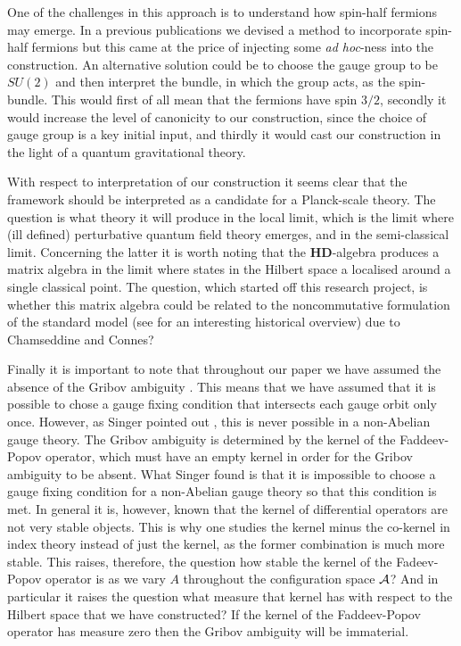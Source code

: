 \documentclass[letterpaper,11pt]{article}
\def\ca{{\cal A}}
\begin{document}
One of the challenges in this approach is to understand how spin-half fermions may emerge. In a previous publications we devised a method to incorporate spin-half fermions but this came at the price of injecting some {\it ad hoc}-ness into the construction. An alternative solution could be to choose the gauge group to be $SU(2)$ and then interpret the bundle, in which the group acts, as the spin-bundle. This would first of all mean that the fermions have spin $3/2$, secondly it would increase the level of canonicity to our construction, since the choice of gauge group is a key initial input, and thirdly it would cast our construction in the light of a quantum gravitational theory. 


With respect to interpretation of our construction it seems clear that the framework should be interpreted as a candidate for a Planck-scale theory. The question is what theory it will produce in the local limit, which is the limit where (ill defined) perturbative quantum field theory emerges, and in the semi-classical limit. Concerning the latter it is worth noting that the $\mathbf{HD}$-algebra produces a matrix algebra in the limit where states in the Hilbert space a localised around a single classical point. The question, which started off this research project, is whether this matrix algebra could be related to the noncommutative formulation of the standard model \cite{Connes:2006qj,Chamseddine:1991qh,Chamseddine:2006ep,Farnsworth:2014vva,Boyle:2016cjt} (see \cite{Chamseddine:2019fjq} for an interesting historical overview) due to Chamseddine and Connes?



Finally it is important to note that throughout our paper we have assumed the absence of the Gribov ambiguity \cite{Gribov:1977wm}. This means that we have assumed that it is possible to chose a gauge fixing condition that intersects each gauge orbit only once. However, as Singer pointed out \cite{Singer:1978dk}, this is never possible in a non-Abelian gauge theory.  
The Gribov ambiguity is determined by the kernel of the Faddeev-Popov operator, which must have an empty kernel in order for the Gribov ambiguity to be absent. What Singer found is that it is impossible to choose a gauge fixing condition for a non-Abelian gauge theory so that this condition is met. 
In general it is, however, known that the kernel of differential operators are not very stable objects. This is why one studies the kernel minus the co-kernel in index theory instead of just the kernel, as the former combination is much more stable. This raises, therefore, the question how stable the kernel of the Fadeev-Popov operator is as we vary $A$ throughout the configuration space $\ca$? And in particular it raises the question what measure that kernel has with respect to the Hilbert space that we have constructed? If the kernel of the Faddeev-Popov operator has measure zero then the Gribov ambiguity will be immaterial. 
\end{document}
